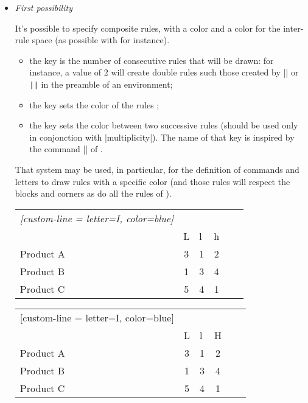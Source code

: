 \documentclass[dvipsnames]{article}%
\begin{document}
\begin{itemize}
\item \emph{First possibility}\par\nobreak

It's possible to specify composite rules, with a color and a color for the
inter-rule space (as possible with  for instance).

\begin{itemize}
\item the key  is the number of consecutive rules that
will be drawn: for instance, a value of $2$ will create double rules such those
created by |\hline\hline| or \verb+||+ in the preamble of an environment;

\item the key  sets the color of the rules ;

\item the key  sets the color between two successive rules
(should be used only in conjonction with |multiplicity|). The name of that key
is inspired by the command |\doublerulesepcolor| of .
\end{itemize}

\medskip
That system may be used, in particular, for the definition of commands and
letters to draw rules with a specific color (and those rules will respect the
blocks and corners as do all the rules of ). 

\medskip
\begin{Code}
\begin{NiceTabular}{lcIcIc}\emph{[custom-line = {letter=I, color=blue}]}
\hline
          &  \\
          & L & l & h \\
\hline
Product A & 3 & 1 & 2 \\
Product B & 1 & 3 & 4 \\
Product C & 5 & 4 & 1 \\
\hline
\end{NiceTabular}
\end{Code}


\begin{center}
\begin{NiceTabular}{lcIcIc}[custom-line = {letter=I, color=blue}]
\hline
          &  \\
          & L & l & H \\
\hline
Product A & 3 & 1 & 2 \\
Product B & 1 & 3 & 4 \\
Product C & 5 & 4 & 1 \\
\hline
\end{NiceTabular}
\end{center}



\end{itemize}
\end{document}
